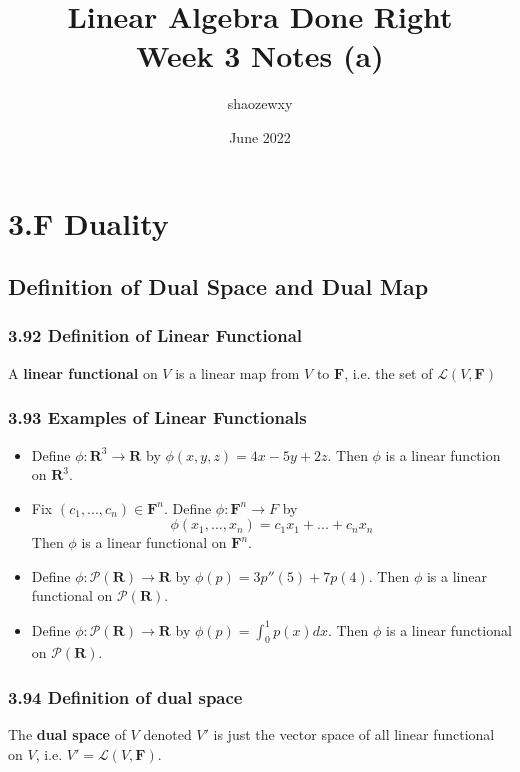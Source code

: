\documentclass{article}
\title{Linear Algebra Done Right\\
\large{Week 3 Notes (a)}}
\author{shaozewxy }
\date{June 2022}
\begin{document}
\maketitle

\setcounter{secnumdepth}{0}
\section*{3.F Duality}
\subsection*{Definition of Dual Space and Dual Map}
\subsubsection*{3.92 Definition of Linear Functional}
A \textbf{linear functional} on $V$ is a linear map from $V$ to $\mathbf{F}$, i.e. the set of $\mathcal{L}(V, \mathbf{F})$
\subsubsection*{3.93 Examples of Linear Functionals}
\begin{itemize}
    \item Define $\phi: \mathbf{R}^3 \rightarrow \mathbf{R}$ by $\phi(x, y, z) = 4x - 5y + 2z$. Then $\phi$ is a linear function on $\mathbf{R}^3$.
    \item Fix $(c_1, ..., c_n) \in \mathbf{F}^n$. Define $\phi: \mathbf{F}^n \rightarrow F$ by
    \begin{equation*}
        \phi(x_1, ..., x_n) = c_1x_1 + ... + c_nx_n
    \end{equation*}
    Then $\phi$ is a linear functional on $\mathbf{F}^n$.
    \item Define $\phi: \mathcal{P}(\mathbf{R}) \rightarrow \mathbf{R}$ by $\phi(p) = 3p''(5) + 7p(4)$. Then $\phi$ is a linear functional on $\mathcal{P}(\mathbf{R})$.
    \item Define $\phi: \mathcal{P}(\mathbf{R}) \rightarrow \mathbf{R}$ by $\phi(p) = \int_{0}^{1}p(x)dx$. Then $\phi$ is a linear functional on $\mathcal{P}(\mathbf{R})$.
\end{itemize}
\subsubsection*{3.94 Definition of dual space}
The \textbf{dual space} of $V$ denoted $V'$ is just the vector space of all linear functional on $V$, i.e. $V' = \mathcal{L}(V, \mathbf{F})$.
\end{document}
